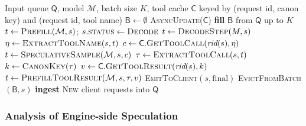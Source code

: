 \begin{algorithm}[h!]
\caption{Inference Engine with Tool Cache} %
\label{alg:engine-speculative}
\begin{algorithmic}[1]
\Require Input queue $\mathsf{Q}$, model $\mathcal{M}$, batch size $K$, tool cache $\mathsf{C}$ keyed by (request id, canon key) and (request id, tool name)
\State $\mathsf{B} \gets \emptyset$
  \State \textsc{AsyncUpdate}($\mathsf{C}$) 
  \State \textbf{fill} $\mathsf{B}$ from $\mathsf{Q}$ up to $K$
    \State $t \gets \textsc{Prefill}(\mathcal{M}, s)$; $s.\textsc{status} \gets \textsc{Decode}$
      \State $t \gets \textsc{DecodeStep}(M, s)$
    \EndIf
    \State
        \State $\eta \gets \textsc{ExtractToolName} (s, t)$
        \State $c \gets \mathsf{C}.\textsc{GetToolCall}(\textit{rid}(s),\eta)$
        \State $t \gets \textsc{SpeculativeSample}(\mathcal{M}, s, c)$ 
        \EndIf
        \State $\tau \gets \textsc{ExtractToolCall}(s, t)$
        \State $k \gets \textsc{CanonKey}(\tau)$
         
          \State $v \gets \mathsf{C}.\textsc{GetToolResult}(\textit{rid}(s), k)$
          \State $t \gets \textsc{PrefillToolResult}(\mathcal{M}, s, \tau, v)$ 
        \EndIf
        \EndIf
      \State
       
        \State \textsc{EmitToClient}$(s, \text{final})$ 
        \State \textsc{EvictFromBatch}$(\mathsf{B}, s)$
      \EndIf
    \EndFor
  \State \textbf{ingest} \textsc{New} client requests into $\mathsf{Q}$
\EndWhile
\end{algorithmic}
\end{algorithm}






\subsubsection{Analysis of Engine-side Speculation}\label{sec:engine-side-analysis}

